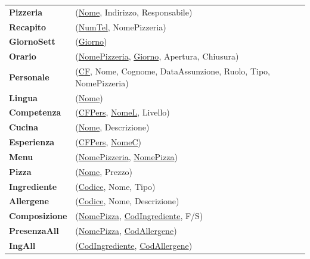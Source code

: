 \documentclass{article}
\begin{document}
\begin{tabular}{ll}
	\textbf{Pizzeria} & (\underline{Nome}, Indirizzo, Responsabile) \\
	
	\textbf{Recapito} & (\underline{NumTel}, NomePizzeria) \\
	
	\textbf{GiornoSett} & (\underline{Giorno}) \\
	
	\textbf{Orario} & (\underline{NomePizzeria}, \underline{Giorno}, Apertura, Chiusura) \\
	
	\textbf{Personale} & (\underline{CF}, Nome, Cognome, DataAssunzione, Ruolo, Tipo, NomePizzeria) \\
	
	\textbf{Lingua} & (\underline{Nome}) \\
	
	\textbf{Competenza} & (\underline{CFPers}, \underline{NomeL}, Livello) \\
	
	\textbf{Cucina} & (\underline{Nome}, Descrizione) \\
	
	\textbf{Esperienza} & (\underline{CFPers}, \underline{NomeC}) \\
	
	\textbf{Menu} & (\underline{NomePizzeria}, \underline{NomePizza}) \\
	
	\textbf{Pizza} & (\underline{Nome}, Prezzo) \\
	
	\textbf{Ingrediente} & (\underline{Codice}, Nome, Tipo) \\
	
	\textbf{Allergene} & (\underline{Codice}, Nome, Descrizione) \\
	
	\textbf{Composizione} & (\underline{NomePizza}, \underline{CodIngrediente}, F/S) \\
	
	\textbf{PresenzaAll} & (\underline{NomePizza}, \underline{CodAllergene}) \\
	
	\textbf{IngAll} & (\underline{CodIngrediente}, \underline{CodAllergene}) \\
\end{tabular}
\end{document}
